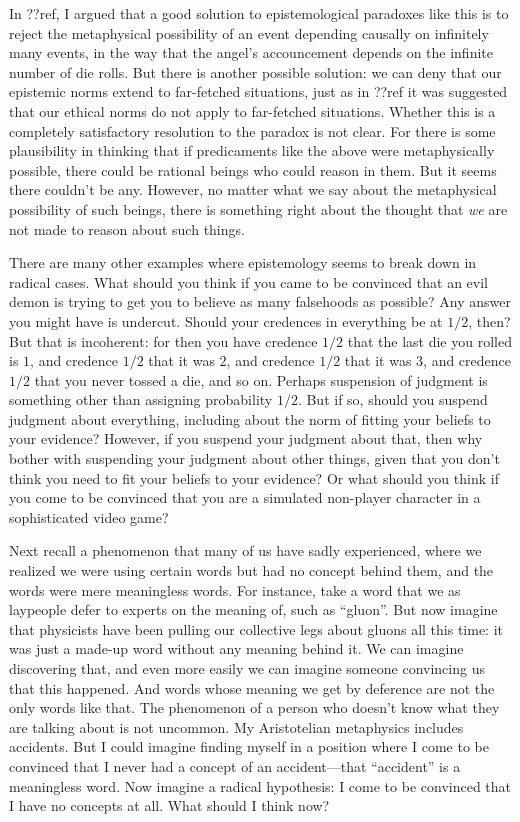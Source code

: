 In ??ref, I argued that a good solution to epistemological paradoxes like this is to reject the metaphysical possibility
of an event depending causally on infinitely many events, in the way that the angel's accouncement depends on the infinite
number of die rolls. But there is another possible solution: we can deny that our epistemic norms extend to far-fetched
situations, just as in ??ref it was suggested that our ethical norms do not apply to far-fetched situations. Whether this is 
a completely satisfactory resolution to the paradox is not clear. For there is some plausibility in thinking that if 
predicaments like the above were metaphysically possible, there could be rational beings who could reason
in them. But it seems there couldn't be any. However, no matter what we say about the metaphysical possibility of such beings,
there is something right about the thought that \textit{we} are not made to reason about such things.

There are many other examples where epistemology seems to break down in radical cases. What should you think if you came to be
convinced that an evil demon is trying to get you to believe as many falsehoods as possible? Any answer you might have is undercut. Should your credences in everything be at $1/2$, then? But that is incoherent: for then you have credence $1/2$
that the last die you rolled is $1$, and credence $1/2$ that it was $2$, and credence $1/2$ that it was $3$, and credence $1/2$
that you never tossed a die, and so on. Perhaps suspension of judgment is something other than assigning probability $1/2$. But 
if so, should you suspend judgment about everything, including about the norm of fitting your beliefs to your evidence? However,
if you suspend your judgment about that, then why bother with suspending your judgment about other things, given that you don't 
think you need to fit your beliefs to your evidence? Or what should you think if you come to be convinced that you are a  
simulated non-player character in a sophisticated video game? 

Next recall a phenomenon that many of us have sadly experienced, where we realized we were using certain words but had no concept behind them, and
the words were mere meaningless words. For instance, take a word that we as laypeople defer to experts on the meaning of, such
as ``gluon''. But now imagine that physicists have been pulling our collective legs about gluons all this time: it was just a 
made-up word without any meaning behind it. We can imagine discovering that, and even more easily we can imagine
someone convincing us that this happened. And words whose meaning we get by deference are not
the only words like that. The phenomenon of a person who doesn't know what they are talking about is not uncommon. My Aristotelian metaphysics
includes accidents. But I could imagine finding myself in a position where I come to be convinced that I never had a concept of
an accident---that ``accident'' is a meaningless word. Now imagine a radical hypothesis: I come to be convinced that I have no
concepts at all. What should I think now? 

